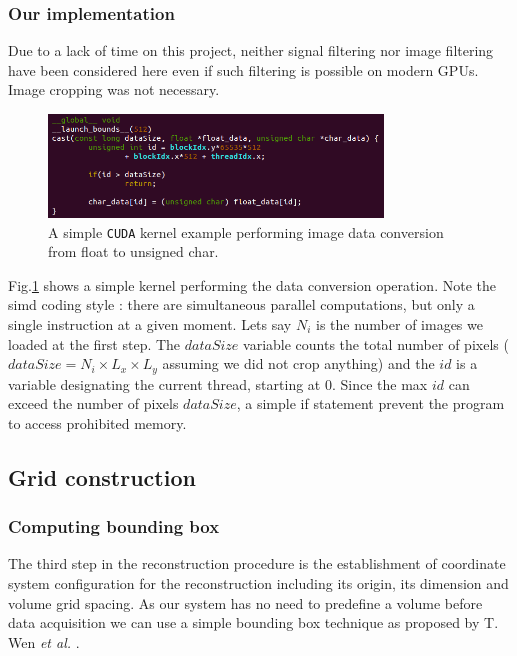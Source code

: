 \documentclass[12pt,journal,compsoc]{IEEEtran}
\begin{document}
\subsubsection{Our implementation}
Due to a lack of time on this project, neither signal filtering nor image filtering have been considered here even if such filtering is possible on modern GPUs. Image cropping was not necessary.

\begin{figure}[!ht]
\centering
\includegraphics[width=3.5in]{simple_kernel}
\caption{A simple \texttt{CUDA} kernel example performing image data conversion from float to unsigned char.}
\label{kernel}
\end{figure}

Fig.\ref{kernel} shows a simple kernel performing the data conversion operation. Note the \ac{simd} coding style : there are simultaneous parallel computations, but only a single instruction at a given moment. Lets say $N_i$ is the number of images we loaded at the first step. 
The $dataSize$ variable counts the total number of pixels ($dataSize=N_i\times L_x\times L_y$ assuming we did not crop anything) and the $id$ is a variable designating the current thread, starting at 0. Since the max $id$ can exceed the number of pixels $dataSize$, a simple if statement prevent the program to access prohibited memory. 

\subsection{Grid construction}

\subsubsection{Computing bounding box}

The third step in the reconstruction procedure is the establishment of coordinate system configuration for the reconstruction including its origin, its dimension and volume grid spacing. 
As our system has no need to predefine a volume before data acquisition we can use a simple bounding box technique as proposed by T. Wen \textit{et al.} \cite{2}.
\end{document}
